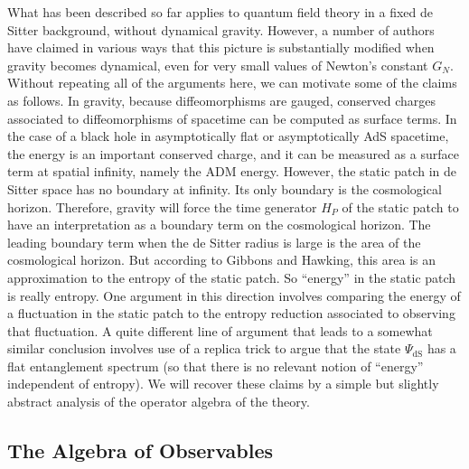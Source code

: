 \documentclass[11pt,a4paper]{article}
\def\dS{{\mathrm{dS}}}
\begin{document}
What has been described so far applies to quantum field theory in a fixed de Sitter background, without dynamical gravity.   However, a number of authors
\cite{BanksOne,BanksTwo,SusskindA,Susskind}
have claimed in various ways
that this picture is substantially modified when gravity becomes dynamical, even for very small values of Newton's constant $G_N$.    Without repeating all of the arguments
here, we can motivate some of the claims as follows.   In gravity, because diffeomorphisms are gauged, conserved charges associated to diffeomorphisms of
spacetime can be computed as surface terms.   In the case of a black hole in asymptotically flat or asymptotically AdS spacetime, the energy is 
an important conserved charge, and it can be measured as a surface term at spatial infinity, namely the ADM energy.   However, the static patch in de Sitter space has
no boundary at infinity.   Its only boundary is the cosmological horizon.   Therefore, gravity will force the time generator $H_P$ of the static patch to have an interpretation
as a boundary term on the cosmological horizon.   The leading boundary term when the de Sitter radius is large is the area of the cosmological horizon.  But
according to Gibbons and Hawking, this area is an approximation to the entropy of the static patch.   So ``energy'' in the static patch is really entropy.
One argument in this direction \cite{Susskind} involves comparing the energy of a fluctuation in the static patch to the entropy
reduction associated to observing that fluctuation.   A quite different line of argument \cite{DST} that leads to a somewhat similar conclusion
involves use of a replica trick to argue that the state $\Psi_\dS$ has a flat
entanglement spectrum (so that there is no relevant notion of ``energy'' independent of entropy).   
  We will recover these claims by a simple but slightly abstract analysis of the operator
algebra of the theory.

\subsection{The Algebra of Observables}  
  
\end{document}
